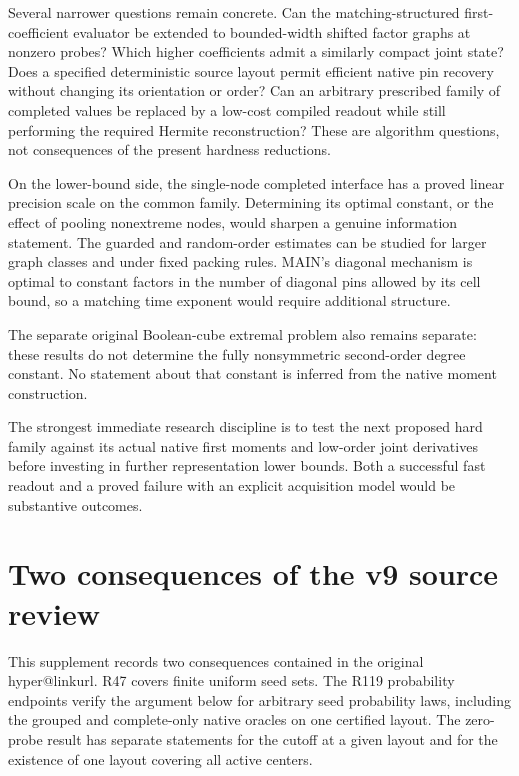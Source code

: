 \documentclass[11pt,a4paper]{article}
\makeatletter
\newcommand{\PaperSixCatalogue}[1]{\csname hyper@linkurl\endcsname{#1}{EVIDENCE_CATALOG.md}}
\newcommand{\PaperSixEvidence}[2]{\PaperSixCatalogue{#2}}
\makeatother
\begin{document}
Several narrower questions remain concrete. Can the matching-structured
first-coefficient evaluator be extended to bounded-width shifted factor
graphs at nonzero probes? Which higher coefficients admit a similarly
compact joint state? Does a specified deterministic source layout permit
efficient native pin recovery without changing its orientation or order?
Can an arbitrary prescribed family of completed values be replaced by a
low-cost compiled readout while still performing the required Hermite
reconstruction? These are algorithm questions, not consequences of the
present hardness reductions.

On the lower-bound side, the single-node completed interface has a
proved linear precision scale on the common family. Determining its
optimal constant, or the effect of pooling nonextreme nodes, would
sharpen a genuine information statement. The guarded and random-order
estimates can be studied for larger graph classes and under fixed
packing rules. MAIN's diagonal mechanism is optimal to constant factors
in the number of diagonal pins allowed by its cell bound, so a matching
time exponent would require additional structure.

The separate original Boolean-cube extremal problem also remains
separate: these results do not determine the fully nonsymmetric
second-order degree constant. No statement about that constant is
inferred from the native moment construction.

The strongest immediate research discipline is to test the next proposed
hard family against its actual native first moments and low-order joint
derivatives before investing in further representation lower bounds.
Both a successful fast readout and a proved failure with an explicit
acquisition model would be substantive outcomes.



\clearpage
\section{Two consequences of the v9 source review}\label{r47-v9-review-consequences}
This supplement records two consequences contained in the original
\PaperSixEvidence{evidence/closeout/v9/independent_coverage_review.md}{independent
v9 source review}. R47 covers finite uniform seed sets. The R119
probability endpoints verify the argument below for arbitrary seed
probability laws, including the grouped and complete-only native
oracles on one certified layout. The zero-probe result has
separate statements for the cutoff at a given layout and for the
existence of one layout covering all active centers.
\end{document}
